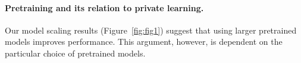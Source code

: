 \paragraph{Pretraining and its relation to private learning.}
Our model scaling results (Figure~\ref{fig:fig1}) suggest that using larger pretrained models improves performance. 
This argument, however, is dependent on the particular choice of pretrained models.

